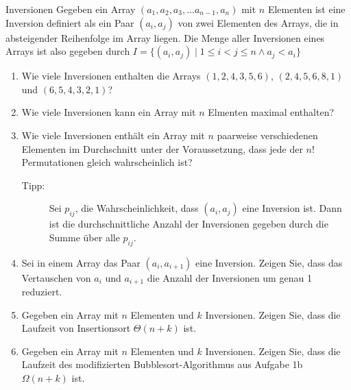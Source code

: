 \documentclass[11pt,a4paper]{article}
\begin{document}
\begin{aufgabe}{3}{Inversionen}
    Gegeben ein Array $(a_1, a_2, a_3, \ldots a_{n - 1}, a_n)$ mit $n$ Elementen ist eine Inversion definiert als ein Paar $(a_i, a_j)$ von zwei Elementen des Arrays, die in absteigender Reihenfolge im Array liegen.
    Die Menge aller Inversionen eines Arrays ist also gegeben durch $I = \{(a_i, a_j) \mid 1 \leq i < j \leq n \wedge a_j  < a_i \}$
    \begin{enumerate}
        \item Wie viele Inversionen enthalten die Arrays $(1, 2, 4, 3, 5, 6)$, $(2, 4, 5, 6, 8, 1)$ und $(6, 5, 4, 3, 2, 1)$?

        \item Wie viele Inversionen kann ein Array mit $n$ Elmenten maximal enthalten?

        \item Wie viele Inversionen enthält ein Array mit $n$ paarweise verschiedenen Elementen im Durchschnitt unter der Voraussetzung, dass jede der $n!$ Permutationen gleich wahrscheinlich ist?
        \begin{description}
            \item[Tipp:] Sei $p_{ij}$, die Wahrscheinlichkeit, dass $(a_i, a_j)$ eine Inversion ist. Dann ist die durchschnittliche Anzahl der Inversionen gegeben durch die Summe über alle $p_{ij}$.
        \end{description}

        \item Sei in einem Array das Paar $(a_i, a_{i + 1})$ eine Inversion. Zeigen Sie, dass das Vertauschen von $a_i$ und $a_{i + 1}$ die Anzahl der Inversionen um genau 1 reduziert.
        
        \item Gegeben ein Array mit $n$ Elementen und $k$ Inversionen. Zeigen Sie, dass die Laufzeit von Insertionsort $\Theta(n + k)$ ist.

        \item Gegeben ein Array mit $n$ Elementen und $k$ Inversionen. Zeigen Sie, dass die Laufzeit des modifizierten Bubblesort-Algorithmus aus Aufgabe 1b $\Omega(n + k)$ ist.
    \end{enumerate}
\end{aufgabe}
\end{document}
